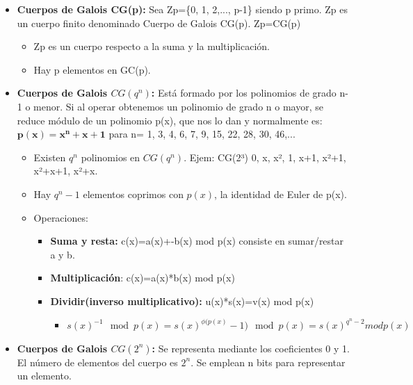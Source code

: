 \documentclass[12pt, twoside, openright]{report} %
\begin{document}
\begin{itemize}
\begin{itemize}
    \end{itemize}
  \item \textbf{Cuerpos de Galois CG(p):} Sea Zp=\{0, 1, 2,..., p-1\} siendo
    p primo. Zp es un cuerpo finito denominado Cuerpo de Galois CG(p).
    Zp=CG(p)
    

    \begin{itemize}
    \item Zp es un cuerpo respecto a la suma y la multiplicación.
      
    \item Hay p elementos en GC(p).
      
    \end{itemize}
  \item \textbf{Cuerpos de Galois $CG(q^n)$:} Está formado por los
    polinomios de grado n-1 o menor. Si al operar obtenemos un polinomio
    de grado n o mayor, se reduce módulo de un polinomio p(x), que nos
    lo dan y normalmente es: $\boldsymbol{p(x)=x^n+x+1}$ para n= 1, 3, 4,
    6, 7, 9, 15, 22, 28, 30, 46,...
    

    \begin{itemize}
    \item Existen $q^n$ polinomios en $CG(q^n)$. Ejem: CG(2³) 0, x, x², 1,
      x+1, x²+1, x²+x+1, x²+x.
      
    \item Hay $q^n -1$ elementos coprimos con $p(x)$, la identidad de Euler
      de p(x).
      
    \item Operaciones:
      

      \begin{itemize}
      \item \textbf{Suma y resta:} c(x)=a(x)+-b(x) mod p(x) consiste en
        sumar/restar a y b.
        
      \item \textbf{Multiplicación}: c(x)=a(x)*b(x) mod p(x)
        
      \item \textbf{Dividir(inverso multiplicativo):} u(x)*s(x)=v(x) mod
        p(x)
        

        \begin{itemize}
        \item $s(x)^{-1} \mod p(x) = s(x)^{\phi(p(x)} -1) \mod p(x) = s(x)^{q^n -2} mod p(x)$
          
        \end{itemize}
      \end{itemize}
    \end{itemize}
  \item \textbf{Cuerpos de Galois $CG(2^n)$:} Se representa mediante los
    coeficientes 0 y 1. El número de elementos del cuerpo es $2^n$. Se
    emplean n bits para representar un elemento.
    


\end{itemize}
\end{document}
